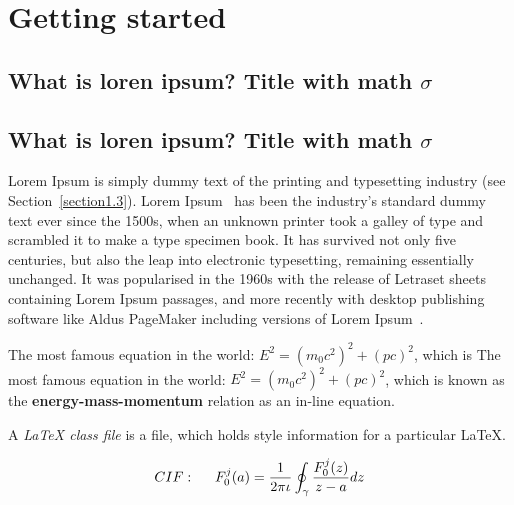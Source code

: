 
\chapter{Getting started}  %

\ifpdf
    \graphicspath{{Chapter1/Figs/Raster/}{Chapter1/Figs/PDF/}{Chapter1/Figs/}}
\else
    \graphicspath{{Chapter1/Figs/Vector/}{Chapter1/Figs/}}
\fi


\section{What is loren ipsum? Title with math \texorpdfstring{$\sigma$}{[sigma]}} %
\section{What is loren ipsum? Title with math \texorpdfstring{$\sigma$}{[sigma]}} %

Lorem Ipsum is simply dummy text of the printing and typesetting industry (see
Section~\ref{section1.3}). Lorem Ipsum~\cite{Aup91} has been the industry's
standard dummy text ever since the 1500s, when an unknown printer took a galley
of type and scrambled it to make a type specimen book. It has survived not only
five centuries, but also the leap into electronic typesetting, remaining
essentially unchanged. It was popularised in the 1960s with the release of
Letraset sheets containing Lorem Ipsum passages, and more recently with desktop
publishing software like Aldus PageMaker including versions of Lorem
Ipsum~\cite{AAB95,Con90,LM65}.

The most famous equation in the world: $E^2 = (m_0c^2)^2 + (pc)^2$, which is
The most famous equation in the world: $E^2 = (m_0c^2)^2 + (pc)^2$, which is
known as the \textbf{energy-mass-momentum} relation as an in-line equation.

A {\em \LaTeX{} class file} is a file, which holds style information for a particular \LaTeX{}.


\begin{align}
CIF: \hspace*{5mm}F_0^j(a) = \frac{1}{2\pi \iota} \oint_{\gamma} \frac{F_0^j(z)}{z - a} dz
\end{align}


